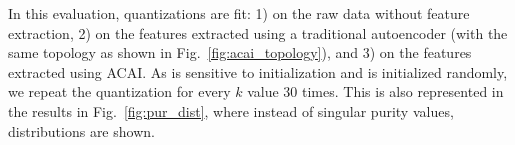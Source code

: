 			In this evaluation, \kmeans{} quantizations are fit: 1) on the raw data without feature extraction, 2) on the features extracted using a traditional autoencoder (with the same topology as shown in Fig.~\ref{fig:acai_topology}), and 3) on the features extracted using \ac{ACAI}.
			As \kmeans{} is sensitive to initialization and is initialized randomly, we repeat the quantization for every $k$ value $30$ times.
			This is also represented in the results in Fig.~\ref{fig:pur_dist}, where instead of singular purity values, distributions are shown.

			\begin{figure}
				\centering
				 \\
\end{figure}
